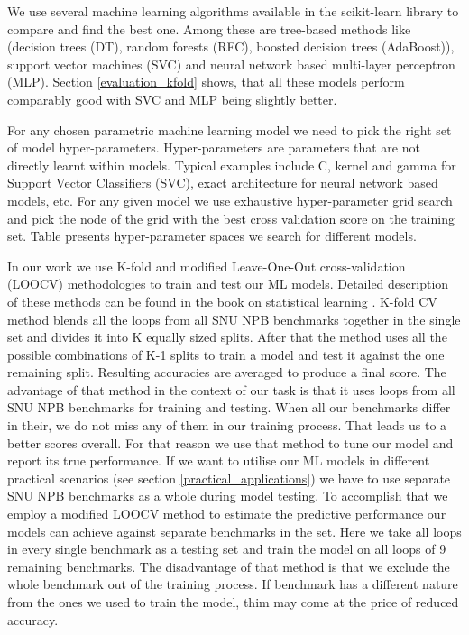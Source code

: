 \documentclass{acaces}
\begin{document}
\quad We use several machine learning algorithms available in the scikit-learn library to compare and find the best one. Among these are tree-based methods like (decision trees (DT), random forests (RFC), boosted decision trees (AdaBoost)), support vector machines (SVC) and neural network based multi-layer perceptron (MLP). Section \ref{evaluation_kfold} shows, that all these models perform comparably good with SVC and MLP being slightly better. 

\quad For any chosen parametric machine learning model we need to pick the right set of model hyper-parameters. Hyper-parameters are parameters that are not directly learnt within models. Typical examples include C, kernel and gamma for Support Vector Classifiers (SVC), exact architecture for neural network based models, etc. For any given model we use exhaustive hyper-parameter grid search and pick the node of the grid with the best cross validation score on the training set. Table presents hyper-parameter spaces we search for different models.

\quad In our work we use K-fold and modified Leave-One-Out cross-validation (LOOCV) methodologies to train and test our ML models. Detailed description of these methods can be found in the book on statistical learning \cite{James:2014:ISL:2517747}.\newline\null
\quad K-fold CV method blends all the loops from all SNU NPB benchmarks together in the single set and divides it into K equally sized splits. After that the method uses all the possible combinations of K-1 splits to train a model and test it against the one remaining split. Resulting accuracies are averaged to produce a final score. The advantage of that method in the context of our task is that it uses loops from all SNU NPB benchmarks for training and testing. When all our benchmarks differ in their, we do not miss any of them in our training process. That leads us to a better scores overall. For that reason we use that method to tune our model and report its true performance.\newline\null
\quad If we want to utilise our ML models in different practical scenarios (see section \ref{practical_applications}) we have to use separate SNU NPB benchmarks as a whole during model testing. To accomplish that we employ a modified LOOCV method to estimate the predictive performance our models can achieve against separate benchmarks in the set. Here we take all loops in every single benchmark as a testing set and train the model on all loops of 9 remaining benchmarks. The disadvantage of that method is that we exclude the whole benchmark out of the training process. If benchmark has a different nature from the ones we used to train the model, thim may come at the price of reduced accuracy.
\end{document}
